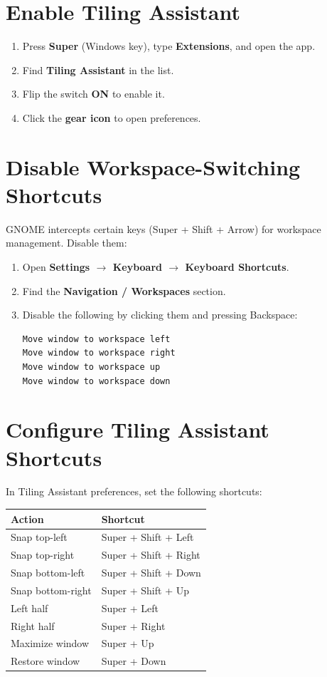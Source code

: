 \documentclass[12pt]{article}
\begin{document}
\section{Enable Tiling Assistant}
\begin{enumerate}
    \item Press \textbf{Super} (Windows key), type \textbf{Extensions}, and open the app.
    \item Find \textbf{Tiling Assistant} in the list.
    \item Flip the switch \textbf{ON} to enable it.
    \item Click the \textbf{gear icon} to open preferences.
\end{enumerate}

\section{Disable Workspace-Switching Shortcuts}
GNOME intercepts certain keys (Super + Shift + Arrow) for workspace management. Disable them:
\begin{enumerate}
    \item Open \textbf{Settings $\rightarrow$ Keyboard $\rightarrow$ Keyboard Shortcuts}.
    \item Find the \textbf{Navigation / Workspaces} section.
    \item Disable the following by clicking them and pressing Backspace:
\begin{lstlisting}
Move window to workspace left
Move window to workspace right
Move window to workspace up
Move window to workspace down
\end{lstlisting}
\end{enumerate}

\section{Configure Tiling Assistant Shortcuts}
In Tiling Assistant preferences, set the following shortcuts:

\begin{longtable}{|p{3cm}|p{5cm}|}
\hline
\textbf{Action} & \textbf{Shortcut} \\
\hline
Snap top-left & Super + Shift + Left \\
Snap top-right & Super + Shift + Right \\
Snap bottom-left & Super + Shift + Down \\
Snap bottom-right & Super + Shift + Up \\
Left half & Super + Left \\
Right half & Super + Right \\
Maximize window & Super + Up \\
Restore window & Super + Down \\
\hline
\end{longtable}
\end{document}
